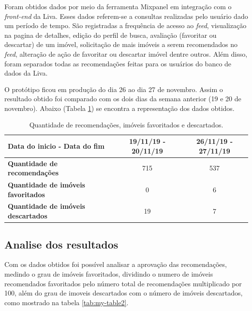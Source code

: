 Foram obtidos dados por meio da ferramenta Mixpanel em integração com o \textit{front-end} da Liva. Esses dados referem-se a consultas realizadas pelo usuário dado um período de tempo. São registradas a frequência de acesso ao \textit{feed}, visualização na pagina de detalhes, edição do perfil de busca, avaliação (favoritar ou descartar) de um imóvel, solicitação de mais imóveis a serem recomendados no \textit{feed}, alteração de ação de favoritar ou descartar imóvel dentre outros. Além disso, foram separados todas as recomendações feitas para os usuários do banco de dados da Liva.

O protótipo ficou em produção do dia 26 ao dia 27 de novembro. Assim o resultado obtido foi comparado com os dois dias da semana anterior (19 e 20 de novembro). Abaixo (Tabela \ref{tab:my-table}) se encontra a representação dos dados obtidos.

\begin{table}[H]
\centering
\caption[Quantidade de recomendações, imóveis favoritados e descartados]{Quantidade de recomendações, imóveis favoritados e descartados.}
\begin{tabular}{lcc}
\hline
\textbf{Data do inicio - Data do fim} & 19/11/19 - 20/11/19 & 26/11/19 - 27/11/19 \\ \hline
\textbf{Quantidade de recomendações} & 715 & 537 \\ \hline
\textbf{Quantidade de imóveis favoritados} & 0 & 6 \\ \hline
\textbf{Quantidade de imóveis descartados} & 19 & 7 \\ \hline
\end{tabular}
\label{tab:my-table}
\end{table}



\subsection{Analise dos resultados}

Com os dados obtidos foi possível analisar a aprovação das recomendações, medindo o grau de imóveis favoritados, dividindo o numero de imóveis recomendados favoritados pelo número total de recomendações multiplicado por 100, além do grau de imoveis descartados com o número de imóveis descartados, como mostrado na tabela \ref{tab:my-table2}.

